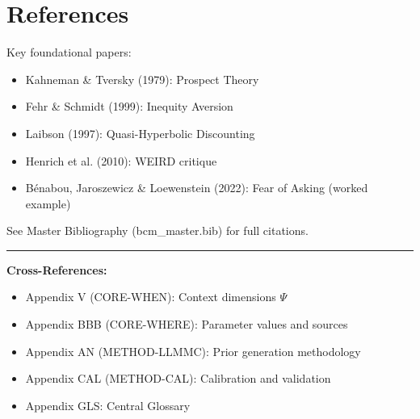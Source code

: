 
\section{References}

\nocite{bcm_master}

Key foundational papers:
\begin{itemize}
    \item Kahneman \& Tversky (1979): Prospect Theory
    \item Fehr \& Schmidt (1999): Inequity Aversion
    \item Laibson (1997): Quasi-Hyperbolic Discounting
    \item Henrich et al. (2010): WEIRD critique
    \item Bénabou, Jaroszewicz \& Loewenstein (2022): Fear of Asking (worked example)
\end{itemize}

See Master Bibliography (bcm\_master.bib) for full citations.



\vspace{1cm}
\hrule
\vspace{0.3cm}
\textbf{Cross-References:}
\begin{itemize}
    \item Appendix V (CORE-WHEN): Context dimensions $\Psi$
    \item Appendix BBB (CORE-WHERE): Parameter values and sources
    \item Appendix AN (METHOD-LLMMC): Prior generation methodology
    \item Appendix CAL (METHOD-CAL): Calibration and validation
    \item Appendix GLS: Central Glossary
\end{itemize}


